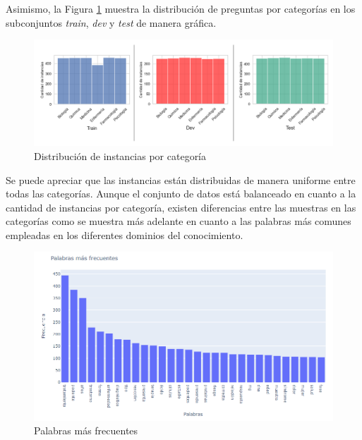 Asimismo, la Figura \ref{train_dev_test} muestra la distribución de preguntas por categorías en los subconjuntos \textit{train}, \textit{dev} y \textit{test} de manera gráfica.

\begin{figure}[!b]
  \begin{center}
    \includegraphics[angle=0, width=1\textwidth]{Graphics/train_dev_test.png}
  \end{center}
    \caption{Distribución de instancias por categoría}\label{train_dev_test}
\end{figure}

Se puede apreciar que las instancias están distribuidas de manera uniforme entre todas las categorías. Aunque el conjunto de datos está balanceado en cuanto a la cantidad de instancias por categoría, existen diferencias entre las muestras en las categorías como se muestra más adelante en cuanto a las palabras más comunes empleadas en los diferentes dominios del conocimiento.

\begin{figure}[!tb]
  \begin{center}
    \includegraphics[angle=0, width=1\textwidth]{Graphics/words.png}
  \end{center}
    \caption{Palabras más frecuentes}\label{words}
\end{figure}

